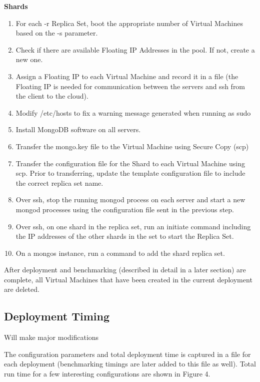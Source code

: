 \documentclass[9pt,twocolumn,twoside]{../../styles/osajnl}
\begin{document}
\textbf{Shards}
\vspace{-\topsep}
\begin{enumerate}
\item For each -r Replica Set, boot the appropriate number of Virtual Machines based on the -s parameter.
\item Check if there are available Floating IP Addresses in the pool.  If not, create a new one.
\item Assign a Floating IP to each Virtual Machine and record it in a file (the Floating IP is needed for communication between the servers and ssh from the client to the cloud).
\item Modify /etc/hosts to fix a warning message generated when running as sudo
\item Install MongoDB software on all servers.
\item Transfer the mongo.key file to the Virtual Machine using Secure Copy (scp)
\item Transfer the configuration file for the Shard to each Virtual Machine using scp.  Prior to transferring, update the template configuration file to include the correct replica set name.
\item Over ssh, stop the running mongod process on each server and start a new mongod processes using the configuration file sent in the previous step.
\item Over ssh, on one shard in the replica set, run an initiate command including the IP addresses of the other shards in the set to start the Replica Set.
\item On a mongos instance, run a command to add the shard replica set.
\end{enumerate}
\vspace{-\topsep}



After deployment and benchmarking (described in detail in a later section) are complete, all Virtual Machines that have been created in the current deployment are deleted.

\subsection{Deployment Timing}

Will make major modifications

The configuration parameters and total deployment time is captured in a file for each deployment (benchmarking timings are later added to this file as well).  Total run time for a few interesting configurations are shown in Figure 4.  
\end{document}
